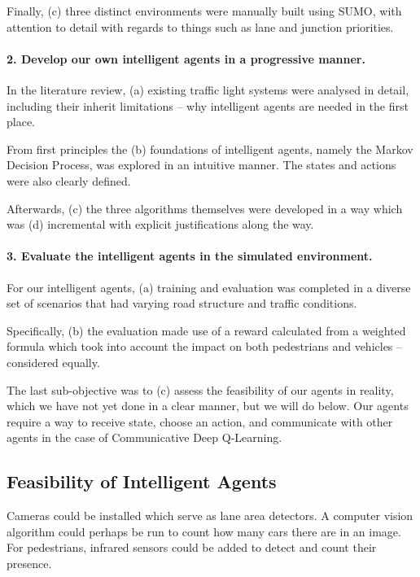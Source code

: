 \documentclass[a4paper]{report}
\begin{document}
Finally, (c) three distinct environments were manually built using SUMO, with attention to detail with regards to things such as lane and junction priorities.

\paragraph{2. Develop our own intelligent agents in a progressive manner.}

In the literature review, (a) existing traffic light systems were analysed in detail, including their inherit limitations -- why intelligent agents are needed in the first place.

From first principles the (b) foundations of intelligent agents, namely the Markov Decision Process, was explored in an intuitive manner. The states and actions were also clearly defined. 

Afterwards, (c) the three algorithms themselves were developed in a way which was (d) incremental with explicit justifications along the way. 

\paragraph{3. Evaluate the intelligent agents in the simulated environment.}

For our intelligent agents, (a) training and evaluation was completed in a diverse set of scenarios that had varying road structure and traffic conditions.

Specifically, (b) the evaluation made use of a reward calculated from a weighted formula which took into account the impact on both pedestrians and vehicles -- considered equally.

The last sub-objective was to (c) assess the feasibility of our agents in reality, which we have not yet done in a clear manner, but we will do below. Our agents require a way to receive state, choose an action, and communicate with other agents in the case of Communicative Deep Q-Learning.

\subsection{Feasibility of Intelligent Agents}

Cameras could be installed which serve as lane area detectors. A computer vision algorithm could perhaps be run to count how many cars there are in an image. For pedestrians, infrared sensors could be added to detect and count their presence.
\end{document}
